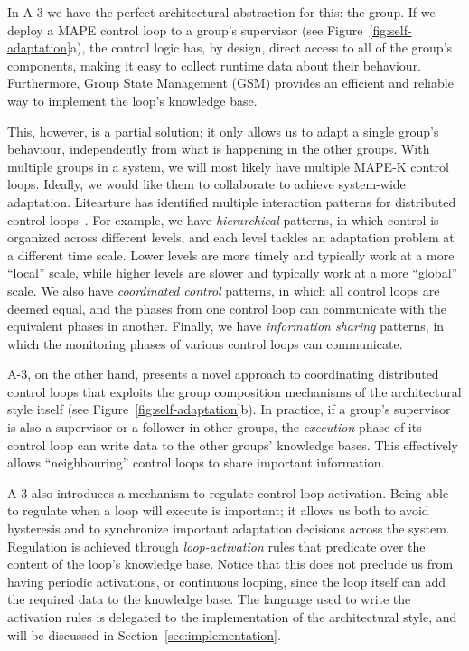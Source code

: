 In A-3 we have the perfect architectural abstraction for this: the group. If we deploy a MAPE control loop to a group's supervisor (see Figure~\ref{fig:self-adaptation}a), the control logic has, by design, direct access to all of the group's components, making it easy to collect runtime data about their behaviour. Furthermore, Group State Management (GSM) provides an efficient and reliable way to implement the loop's knowledge base. 

This, however, is a partial solution; it only allows us to adapt a single group's behaviour, independently from what is happening in the other groups. With multiple groups in a system, we will most likely have multiple MAPE-K control loops. Ideally, we would like them to collaborate to achieve system-wide adaptation. Litearture has identified multiple interaction patterns for distributed control loops~\cite{mirandola}. For example, we have \emph{hierarchical} patterns, in which control is organized across different levels, and each level tackles an adaptation problem at a different time scale. Lower levels are more timely and typically work at a more ``local'' scale, while higher levels are slower and typically work at a more ``global'' scale. We also have \emph{coordinated control} patterns, in which all control loops are deemed equal, and the phases from one control loop can communicate with the equivalent phases in another. Finally, we have \emph{information sharing} patterns, in which the monitoring phases of various control loops can communicate. 

A-3, on the other hand, presents a novel approach to coordinating distributed control loops that exploits the group composition mechanisms of the architectural style itself (see Figure~\ref{fig:self-adaptation}b). In practice, if a group's supervisor is also a supervisor or a follower in other groups, the \emph{execution} phase of its control loop can write data to the other groups' knowledge bases. This effectively allows ``neighbouring'' control loops to share important information. 

A-3 also introduces a mechanism to regulate control loop activation. Being able to regulate when a loop will execute is important; it allows us both to avoid hysteresis and to synchronize important adaptation decisions across the system. Regulation is achieved through \emph{loop-activation} rules that predicate over the content of the loop's knowledge base. Notice that this does not preclude us from having periodic activations, or continuous looping, since the loop itself can add the required data to the knowledge base. The language used to write the activation rules is delegated to the implementation of the architectural style, and will be discussed in Section~\ref{sec:implementation}.





